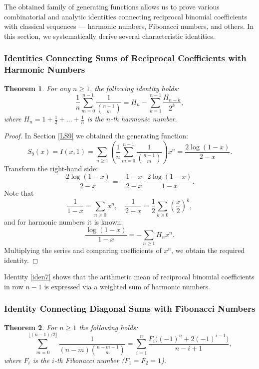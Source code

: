 \documentclass[12pt]{article}
\newtheorem{theorem}{Theorem}[section]
\begin{document}
The obtained family of generating functions allows us to prove various combinatorial and analytic identities connecting reciprocal binomial coefficients with classical sequences — harmonic numbers, Fibonacci numbers, and others. In this section, we systematically derive several characteristic identities.

\subsubsection{Identities Connecting Sums of Reciprocal Coefficients with Harmonic Numbers}

\begin{theorem} For any \( n \geq 1 \), the following identity holds:
\begin{equation}\label{iden7}
\frac{1}{n}\sum_{m=0}^{n-1}\frac{1}{\binom{n-1}{m}}
= H_n - \sum_{k=1}^{n-1}\frac{H_{n-k}}{2^k},
\end{equation}
where \( H_n = 1 + \frac12 + \dots + \frac1n \) is the \( n \)-th harmonic number.
\end{theorem}

\begin{proof} In Section \ref{LS9} we obtained the generating function:
\[
S_9(x) = I(x,1) = \sum_{n\geq 1}\left(\frac{1}{n}\sum_{m=0}^{n-1}\frac{1}{\binom{n-1}{m}}\right)x^n
= \frac{2\log(1-x)}{2-x}.
\]
Transform the right-hand side:
\[
\frac{2\log(1-x)}{2-x} = -\frac{1-x}{2-x}\cdot\frac{2\log(1-x)}{1-x}.
\]
Note that
\[
\frac{1}{1-x} = \sum_{n\geq 0}x^n, \quad
\frac{1}{2-x} = \frac12\sum_{k\geq 0}\left(\frac{x}{2}\right)^k,
\]
and for harmonic numbers it is known:
\[
\frac{\log(1-x)}{1-x} = -\sum_{n\geq 1} H_n x^n.
\]
Multiplying the series and comparing coefficients of \( x^n \), we obtain the required identity.
\end{proof}

Identity \eqref{iden7} shows that the arithmetic mean of reciprocal binomial coefficients in row \( n-1 \) is expressed via a weighted sum of harmonic numbers.

\subsubsection{Identity Connecting Diagonal Sums with Fibonacci Numbers}

\begin{theorem}
 For \( n \geq 1 \) the following holds:
\begin{equation}\label{iden6}
\sum_{m=0}^{\lfloor (n-1)/2 \rfloor} \frac{1}{(n-m)\binom{n-m-1}{m}}
= \sum_{i=1}^{n} \frac{F_i\bigl((-1)^n + 2(-1)^{i-1}\bigr)}{n-i+1},
\end{equation}
where \( F_i \) is the \( i \)-th Fibonacci number (\( F_1 = F_2 = 1 \)).
\end{theorem}
\end{document}
